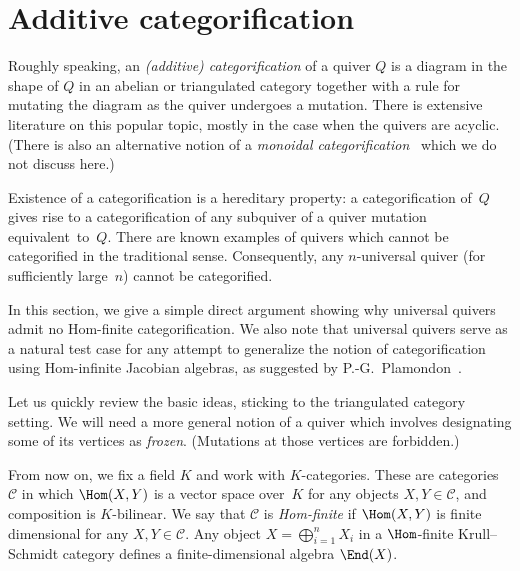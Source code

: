 
\section{Additive categorification}
\label{sec:categorification}

Roughly speaking, an \emph{(additive) categorification} of a quiver 
$Q$ is a diagram in the shape of $Q$ in an abelian or triangulated category together with a rule for mutating the diagram as the quiver undergoes a mutation. 
There is extensive literature on this popular topic, mostly in the case when the quivers are acyclic. 
(There is also an alternative notion of a \emph{monoidal categorification}~\cite{leclerc-hernandez}
which we do not discuss here.) 

Existence of a categorification is a hereditary property: a categorification of~$Q$ gives rise to a categorification of any subquiver of a quiver mutation equivalent~to~$Q$. 
There are known examples of quivers which cannot be categorified in the traditional sense. 
Consequently, any $n$-universal quiver (for sufficiently large~$n$) cannot be categorified. 

In this section, we give a simple direct argument showing why universal quivers admit no Hom-finite categorification. We also note that universal quivers serve as a natural test case for any attempt to generalize the notion of categorification using Hom-infinite Jacobian algebras, as suggested by P.-G.~Plamondon~\cite{plamondon}.

Let us quickly review the basic ideas, sticking to the triangulated category setting. 
We will need a more general notion of a quiver which involves designating some of its vertices as \emph{frozen}. (Mutations at those vertices are forbidden.) 

From now on, we fix a field $K$ and work with $K$-categories. These are categories $\mathcal C$ in which $\Hom(X,Y)$ is a vector space over~$K$ for any objects $X,Y\in \mathcal C$, and composition is $K$-bilinear. We say that $\mathcal C$ is \emph{Hom-finite} if $\Hom(X,Y)$ is finite dimensional for any $X,Y\in \mathcal C$.
%
Any object $X=\bigoplus_{i=1}^nX_i$ in a $\Hom $-finite Krull--Schmidt category defines a finite-dimensional algebra $\End (X)$.

